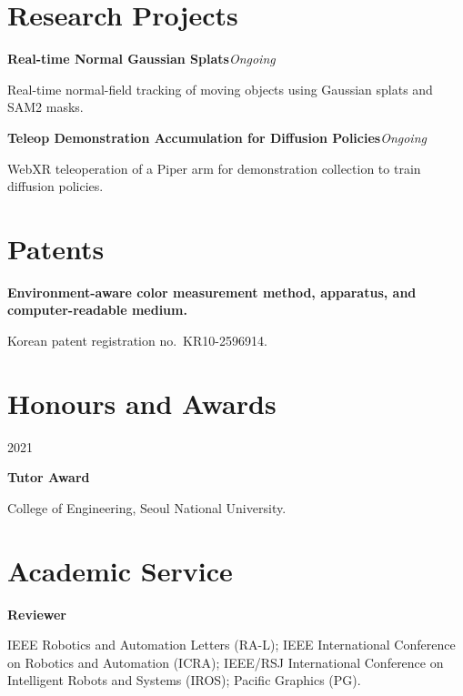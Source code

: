 \documentclass[11pt,a4paper]{article}
\newlength{\datewidth}
\newcommand{\datedentry}[3]{%
  \par\noindent
  \begin{minipage}[t]{\datewidth}
    \raggedright\small #1
  \end{minipage}\hspace{0.15in}%
  \begin{minipage}[t]{\dimexpr\linewidth-\datewidth-0.15in\relax}
    \textbf{#2}\par
    #3
  \end{minipage}\par\vspace{0.5em}}
\begin{document}
\section{Research Projects}

\textbf{Real-time
Normal Gaussian Splats}\hfill\textit{Ongoing}\par
Real-time normal-field tracking of moving objects using Gaussian splats and SAM2 masks.

\vspace{0.65em}
\textbf{Teleop
Demonstration Accumulation for Diffusion Policies}\hfill\textit{Ongoing}\par
WebXR teleoperation of a Piper arm for demonstration collection to train diffusion policies.

\section{Patents}

\textbf{Environment-aware color measurement method, apparatus, and
computer-readable medium.}\par
Korean patent registration no.\ KR10-2596914.

\section{Honours and Awards}

\datedentry{2021}{Tutor Award}{College of Engineering, Seoul National University.}

\section{Academic Service}

\textbf{Reviewer}\par
IEEE Robotics and Automation Letters (RA-L); IEEE International Conference on
Robotics and Automation (ICRA); IEEE/RSJ International Conference on
Intelligent Robots and Systems (IROS); Pacific Graphics (PG).
\end{document}
